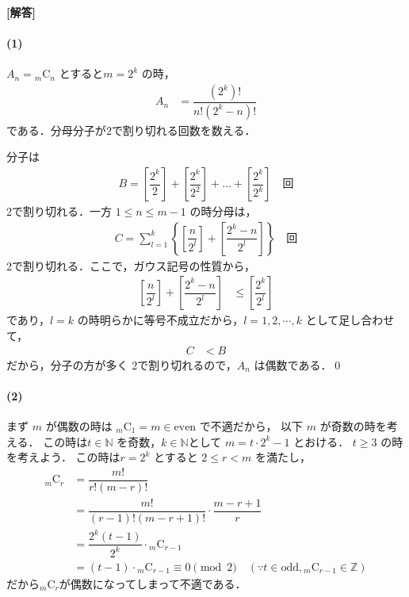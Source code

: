 \documentclass[../../main.tex]{subfiles}
\begin{document}
\begin{oframed}
  
\end{oframed}

{\bf [解答]}

\paragraph{(1)}

$A_n = {}_m\mathrm{C}_n$ とすると$m = 2^k$ の時，
\begin{align}
  A_n &= \dfrac{(2^k)!}{n! (2^k - n)!}
\end{align}
である．分母分子が$2$で割り切れる回数を数える．

分子は
\begin{align}
  B = \left[ \dfrac{2^k}{2} \right] + \left[ \dfrac{2^k}{2^2} \right] + \dots + \left[ \dfrac{2^k}{2^k} \right] \quad \text{回}
\end{align}
2で割り切れる．一方 $1 \le n \le m-1$ の時分母は，
\begin{align}
  C = \sum_{l=1}^k \left\{ \left[ \dfrac{n}{2^l} \right] + \left[ \dfrac{2^k - n}{2^l} \right] \right\} \quad \text{回}
\end{align}
2で割り切れる．ここで，ガウス記号の性質から，
\begin{align}
  \left[ \dfrac{n}{2^l} \right] + \left[ \dfrac{2^k - n}{2^l} \right] &\le \left[ \dfrac{2^k}{2^l} \right]
\end{align}
であり，$l = k$ の時明らかに等号不成立だから，$l=1,2,\cdots,k$ として足し合わせて，
\begin{align}
  C &< B
\end{align}
だから，分子の方が多く 2で割り切れるので，$A_n$ は偶数である．\qed

\paragraph{(2)}

まず $m$ が偶数の時は ${}_m\mathrm{C}_1 = m \in \text{even}$ で不適だから，
以下 $m$ が奇数の時を考える．
この時は$t \in \mathbb{N}$ を奇数，$k\in\mathbb{N}$として $m = t \cdot 2^k - 1$ とおける．
$t \ge 3$ の時を考えよう．
この時は$r = 2^k$ とすると $2 \le r < m$ を満たし，
\begin{align}
  {}_m\mathrm{C}_r &= \dfrac{m!}{r!(m-r)!} \\
  &= \dfrac{m!}{(r-1)!(m-r+1)!} \cdot \dfrac{m-r+1}{r} \\
  &= \dfrac{2^k(t-1)}{2^k} \cdot {}_m\mathrm{C}_{r-1} \\
  &= (t-1) \cdot {}_m\mathrm{C}_{r-1} \equiv 0 \pmod 2 \quad (\because t \in \text{odd}, {}_m\mathrm{C}_{r-1} \in \mathbb{Z})
\end{align}
だから${}_m\mathrm{C}_r$が偶数になってしまって不適である．
\end{document}

